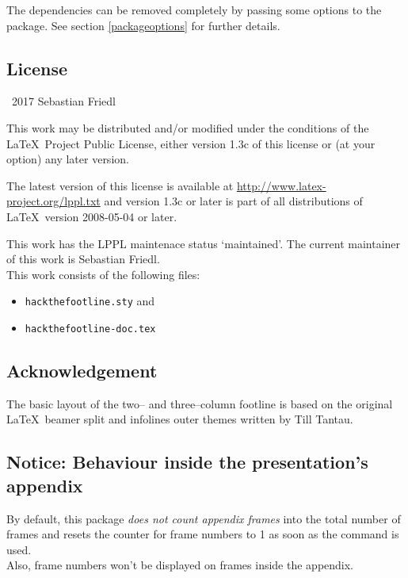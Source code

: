 \documentclass[11pt]{ltxdoc}
\newcommand{\ltxcmd}[1]{\texttt{#1}}
\begin{document}
	\bigskip
	The dependencies can be removed completely by passing some options to the package. See section \ref{packageoptions} for further details.
	
	
	\subsection*{License}
	\begin{small}
		\textcopyright\ 2017 Sebastian Friedl
		
		\smallskip
		This work may be distributed and/or modified under the conditions of the \LaTeX\ Project Public License, either version 1.3c of this license or (at your option) any later version.
		
		\smallskip
		The latest version of this license is available at \url{http://www.latex-project.org/lppl.txt} and version 1.3c or later is part of all distributions of \LaTeX\ version 2008-05-04 or later.
		
		\smallskip
		This work has the LPPL maintenace status \enquote*{maintained}. The current maintainer of this work is Sebastian Friedl. \\
		This work consists of the following files:
		\begin{itemize} \itemsep 0pt
			\item \texttt{hackthefootline.sty} and
			\item \texttt{hackthefootline-doc.tex}
		\end{itemize}
	\end{small}
	
	
	\subsection*{Acknowledgement}
	The basic layout of the two-- and three--column footline is based on the original \LaTeX\ beamer split and infolines outer themes written by Till Tantau.
	
	
	\subsection*{Notice: Behaviour inside the presentation's appendix}
	By default, this package \emph{does not count appendix frames} into the total number of frames and resets the counter for frame numbers to 1 as soon as the \ltxcmd{\appendix} command is used. \\
	Also, frame numbers won't be displayed on frames inside the appendix.
	
\end{document}
